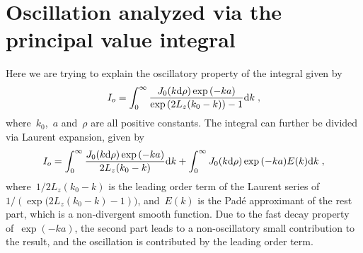 \section{Oscillation analyzed via the principal value integral}

Here we are trying to explain the oscillatory property of the integral given by
\begin{equation}
    I_o = \int_0^{\infty} \frac{J_0(k \mathrm{d} \rho) \exp{(-k a)}}{\exp{(2L_z(k_0 - k))} - 1} \text{d}k\;,
\end{equation}
where~$k_0$,~$a$ and~$\rho$ are all positive constants.
The integral can further be divided via Laurent expansion, given by
\begin{equation}
    I_o = \int_0^{\infty} \frac{J_0(k \mathrm{d} \rho) \exp{(-k a)}}{2L_z(k_0 - k)} \text{d}k + \int_0^{\infty} J_0(k \mathrm{d} \rho) \exp{(-k a)} E(k) \text{d}k\;,
\end{equation}
where~$1/2L_z(k_0 - k)$ is the leading order term of the Laurent series of~$1/(\exp{(2L_z(k_0 - k)} - 1))$, and~$E(k)$ is the Padé approximant of the rest part, which is a non-divergent smooth function.
Due to the fast decay property of~$\exp{(-k a)}$, the second part leads to a non-oscillatory small contribution to the result, and the oscillation is contributed by the leading order term.

